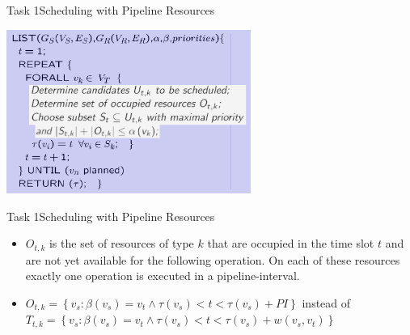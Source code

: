 \begin{frame}[fragile]{Task 1}{Scheduling with Pipeline Resources}
  \begin{solutionnoinc}
    \centering
    \includegraphics[width=0.6\textwidth]{./figures/list_scheduling.png}
  \end{solutionnoinc}
\end{frame}
\begin{frame}[fragile]{Task 1}{Scheduling with Pipeline Resources}
  \begin{solution}
    \begin{itemize}
      \item $O_{t, k}$ is the set of resources of type $k$ that are occupied in the time slot $t$ and are not yet available for the following operation. On each of these resources exactly one operation is executed in a pipeline-interval.
      \item $O_{t, k} = \left\{v_s: \beta\left(v_s\right)=v_t \wedge \tau\left(v_s\right)<t<\tau\left(v_s\right)+PI\right\}$ instead of $T_{t, k} = \left\{v_s: \beta\left(v_s\right)=v_t \wedge \tau\left(v_s\right)<t<\tau\left(v_s\right)+w\left(v_s, v_t\right)\right\}$
    \end{itemize}
  \end{solution}
\end{frame}

